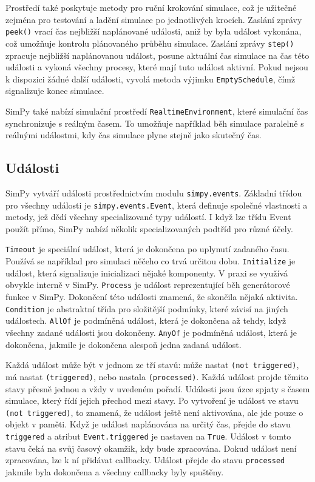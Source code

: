 \documentclass[12pt,a4paper]{article}
\begin{document}
Prostředí také poskytuje metody pro ruční krokování simulace, což je užitečné zejména pro testování a ladění simulace po jednotlivých krocích. Zaslání zprávy \texttt{peek()} vrací čas nejbližší naplánované události, aniž by byla událost vykonána, což umožňuje kontrolu plánovaného průběhu simulace. Zaslání zprávy \texttt{step()} zpracuje nejbližší naplánovanou událost, posune aktuální čas simulace na čas této události a vykoná všechny procesy, které mají tuto událost aktivní. Pokud nejsou k dispozici žádné další události, vyvolá metoda výjimku \texttt{EmptySchedule}, čímž signalizuje konec simulace. 

SimPy také nabízí simulační prostředí \texttt{RealtimeEnvironment}, které simulační čas synchronizuje s reálným časem. To umožňuje například běh simulace paralelně s reálnými událostmi, kdy čas simulace plyne stejně jako skutečný čas.

\subsection{Události}
SimPy vytváří události prostřednictvím modulu \texttt{simpy.events}. Základní třídou pro všechny události je \texttt{simpy.events.Event}, která definuje společné vlastnosti a metody, jež dědí všechny specializované typy událostí. I když lze třídu Event použít přímo, SimPy nabízí několik specializovaných podtříd pro různé účely.

\texttt{Timeout} je speciální událost, která je dokončena po uplynutí zadaného času. Používá se například pro simulaci něčeho co trvá určitou dobu. \texttt{Initialize} je událost, která signalizuje inicializaci nějaké komponenty. V praxi se využívá obvykle interně v SimPy. \texttt{Process} je událost reprezentující běh generátorové funkce v SimPy. Dokončení této události znamená, že skončila nějaká aktivita. \texttt{Condition} je abstraktní třída pro složitější podmínky, které závisí na jiných událostech. \texttt{AllOf} je podmíněná událost, která je dokončena až tehdy, když všechny zadané události jsou dokončeny. \texttt{AnyOf} je podmíněná událost, která je dokončena, jakmile je dokončena alespoň jedna zadaná událost.

Každá událost může být v jednom ze tří stavů: může nastat \texttt{(not triggered)}, má nastat \texttt{(triggered)}, nebo nastala \texttt{(processed)}. Každá událost projde těmito stavy přesně jednou a vždy v uvedeném pořadí. Události jsou úzce spjaty s časem simulace, který řídí jejich přechod mezi stavy. Po vytvoření je událost ve stavu \texttt{(not triggered)}, to znamená, že událost ještě není aktivována, ale jde pouze o objekt v paměti. Když je událost naplánována na určitý čas, přejde do stavu \texttt{triggered} a atribut \texttt{Event.triggered} je nastaven na \texttt{True}. Událost v tomto stavu čeká na svůj časový okamžik, kdy bude zpracována. Dokud událost není zpracována, lze k ní přidávat callbacky. Událost přejde do stavu  \texttt{processed} jakmile byla dokončena a všechny callbacky byly spuštěny.
\end{document}

